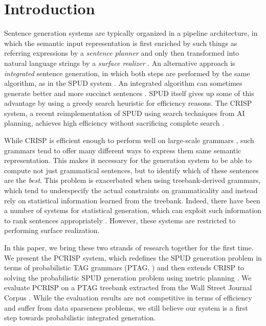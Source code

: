 \section{Introduction}

Sentence generation systems are typically organized in a pipeline
architecture, in which the semantic input representation is first
enriched by such things as referring expressions by a \emph{sentence
  planner} and only then transformed into natural language strings by
a \emph{surface realizer} \cite{reiterdale2000}.  An alternative
approach is \emph{integrated} sentence generation, in which both steps
are performed by the same algorithm, as in the SPUD system
\cite{Stone2003a}.  An integrated algorithm can sometimes generate
better and more succinct sentences \cite{stone98textual}.  SPUD itself
gives up some of this advantage by using a greedy search heuristic
for efficiency reasons.  The CRISP system, a recent reimplementation
of SPUD using search techniques from AI planning, achieves high
efficiency without sacrificing complete search
\cite{kollerstone2007,KolHof10}.

While CRISP is efficient enough to perform well on large-scale
grammars \cite{kollerpetrick2009}, such grammars tend to offer many
different ways to express them same semantic representation.  This
makes it necessary for the generation system to be able to compute not
just grammatical sentences, but to identify which of these sentences
are the \emph{best}. This problem is exacerbated when using
treebank-derived grammars, which tend to underspecify the actual
constraints on grammaticality and instead rely on statistical
information learned from the treebank.  Indeed, there have been a
number of systems for statistical generation, which can exploit such
information to rank sentences appropriately
\cite{langkildeknight1998,whitebaldridge2003,belz2008}.  However,
these systems are restricted to performing surface realization.

In this paper, we bring these two strands of research together for the
first time.  We present the PCRISP system, which redefines the SPUD
generation problem in terms of probabilistic TAG grammars (PTAG,
\cite{resnik1992}) and then extends CRISP to solving the probabilistic
SPUD generation problem using metric planning \cite{fox2002,hoffmann2003}.  We
evaluate PCRISP on a PTAG treebank extracted from the Wall Street
Journal Corpus \cite{chenschanker2004}.  While the evaluation results
are not competitive in terms of efficiency and suffer from data
sparseness problems, we still believe our system is a first step
towards probabilistic integrated generation.

